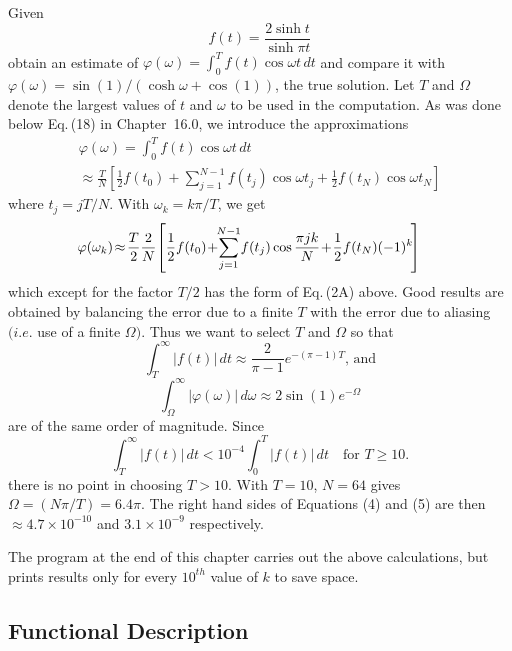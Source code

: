 \documentclass[twoside]{MATH77}
\begin{document}
Given%
\begin{equation*}
f(t)=\frac{2\sinh t}{\sinh \pi t}
\end{equation*}
obtain an estimate of $\varphi (\omega )=\int_0^Tf(t)\cos \omega t\,dt$ and
compare it with $\varphi (\omega )=\sin (1)/(\cosh \omega +\cos (1))$, the true
solution. Let $T$ and $\Omega $ denote the largest values of $t$ and $\omega $
to be used in the computation. As was done below Eq.\,(18) in Chapter~16.0,
we introduce the approximations%
\begin{multline*}
\varphi (\omega ) = \int_0^Tf(t)\cos \omega t\,dt\\
\approx \frac TN\!\left[ \frac 12f(t_0)+\!\sum_{j=1}^{N-1}f(t_j)\cos
\omega t_j+\frac 12f(t_N)\cos \omega t_N\right]
\end{multline*}
where $t_j=j{T}/N$. With $\omega _k=k\pi /{T}$, we get%
\begin{equation*}\hspace{-15pt}
\varphi (\omega _k)\!\approx \!\frac T2\frac 2N\!\left[ \frac
12f(t_0)\!+\!\!\sum_{j=1}^{N-1}\!f(t_j)\cos \frac{\pi jk}N\!+\!\frac
12f(t_N)(-1)^k\!\right]
\end{equation*}
which except for the factor $T/2$ has the form of Eq.\,(2A) above. Good
results are obtained by balancing the error due to a finite $T$ with the
error due to aliasing $(i.e$. use of a finite $\Omega )$. Thus we want to
select $T$ and $\Omega $ so that%
\begin{equation}
\int_T^\infty |f(t)|\,dt\approx \frac 2{\pi -1}e^{-(\pi -1)T}\text{,
and}
\end{equation}\vspace{-10pt}
\begin{equation}
\int_\Omega^\infty |\varphi (\omega )|\,d\omega \approx 2\sin (1)e^{-\Omega}
\end{equation}
are of the same order of magnitude. Since%
\begin{equation*}
\int_T^\infty |f(t)|\,dt<10^{-4}\int_0^T|f(t)|\,dt\quad \text{for }T\geq 10.
\end{equation*}
there is no point in choosing $T>10$. With $T=10$, $N=64$ gives $\Omega =(%
N \pi /{T})=6.4\pi $. The right hand sides of Equations (4) and (5) are
then $\approx 4.7\times 10^{-10}$ and $3.1\times 10^{-9}$ respectively.

The program at the end of this chapter carries out the above calculations,
but prints results only for every $10^{th}$ value of $k$ to save space.

\subsection{Functional Description}
\end{document}
